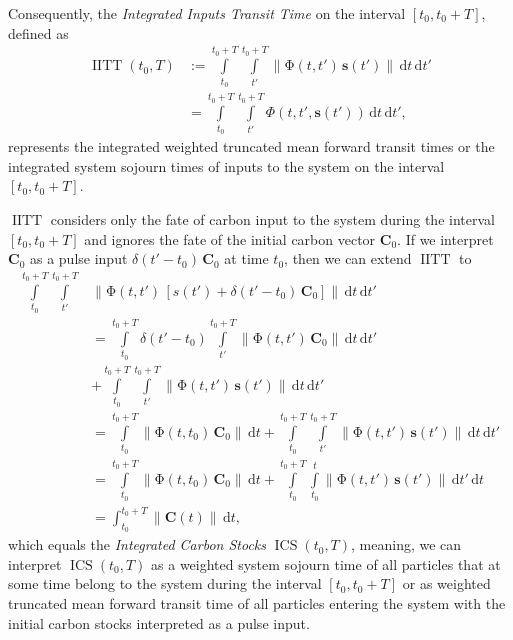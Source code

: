 \documentclass[ProofPDF]{./Styles/Jnls-Template-V3}
\newcommand{\IITT}{\operatorname{IITT}}
\newcommand{\ICS}{\operatorname{ICS}}
\newcommand{\intl}{\int\limits}
\newcommand{\dd}[1]{\,\mathrm{d}#1}
\renewcommand{\vec}[1]{\mathbf{#1}}
\newcommand{\tens}[1]{\mathrm{#1}}
\newcommand{\itPhi}{\mathit{\Phi}}
\newcommand{\vnorm}[1]{\left\|#1\right\|}
\begin{document}
Consequently, the {\it Integrated Inputs Transit Time} on the interval $[t_0, t_0+T]$, defined as
\begin{equation}
    \label{eqn:IITT}
    \begin{aligned}
        \IITT(t_0, T) &:= \intl_{t_0}^{t_0+T} \intl_{t'}^{t_0+T} \vnorm{\tens{\Phi}(t,t')\,\vec{s}(t')}\dd{t}\dd{t'} \\
        & = \intl_{t_0}^{t_0+T} \intl_{t'}^{t_0+T} \itPhi(t,t',\vec{s}(t'))\dd{t}\dd{t'},
    \end{aligned}
\end{equation}
represents the integrated weighted truncated mean forward transit times or the integrated system sojourn times of inputs to the system on the interval $[t_0, t_0+T]$.

$\IITT$ considers only the fate of carbon input to the system during the interval $[t_0,t_0+T]$ and ignores the fate of the initial carbon vector $\vec{C}_0$.
If we interpret $\vec{C}_0$ as a pulse input $\delta(t'-t_0)\,\vec{C}_0$ at time $t_0$, then we can extend $\IITT$ to
\begin{equation}
    \label{eqn:ICS}
    \begin{aligned}
        \intl_{t_0}^{t_0+T} \intl_{t'}^{t_0+T} &\vnorm{\tens{\Phi}(t,t')\,\left[s(t')+ \delta(t'-t_0)\,\vec{C}_0\right]}\dd{t}\dd{t'} \\
        &=\intl_{t_0}^{t_0+T} \delta(t'-t_0) \intl_{t'}^{t_0+T}\vnorm{\tens{\Phi}(t,t')\,\vec{C}_0}\dd{t}\dd{t'} \\
        &+ \intl_{t_0}^{t_0+T}\intl_{t'}^{t_0+T}\vnorm{\tens{\Phi}(t,t')\,\vec{s}(t')}\dd{t}\dd{t'}\\
        &= \intl_{t_0}^{t_0+T}\vnorm{\tens{\Phi}(t,t_0)\,\vec{C}_0}\dd{t} +\intl_{t_0}^{t_0+T}\intl_{t'}^{t_0+T}\vnorm{\tens{\Phi}(t,t')\,\vec{s}(t')}\dd{t}\dd{t'}\\
        & = \intl_{t_0}^{t_0+T}\vnorm{\tens{\Phi}(t,t_0)\,\vec{C}_0}\dd{t} + \intl_{t_0}^{t_0+T} \intl_{t_0}^t \vnorm{\tens{\Phi}(t,t')\,\vec{s}(t')}\dd{t'}\dd{t}\\
        &= \int_{t_0}^{t_0+T} \vnorm{\vec{C}(t)}\dd{t},
    \end{aligned}
\end{equation}
which equals the {\it Integrated Carbon Stocks} $\ICS(t_0,T)$, meaning, we can interpret $\ICS(t_0, T)$ as a weighted system sojourn time of all particles that at some time belong to the system during the interval $[t_0,t_0+T]$ or as weighted truncated mean forward transit time of all particles entering the system with the initial carbon stocks interpreted as a pulse input.
\end{document}
